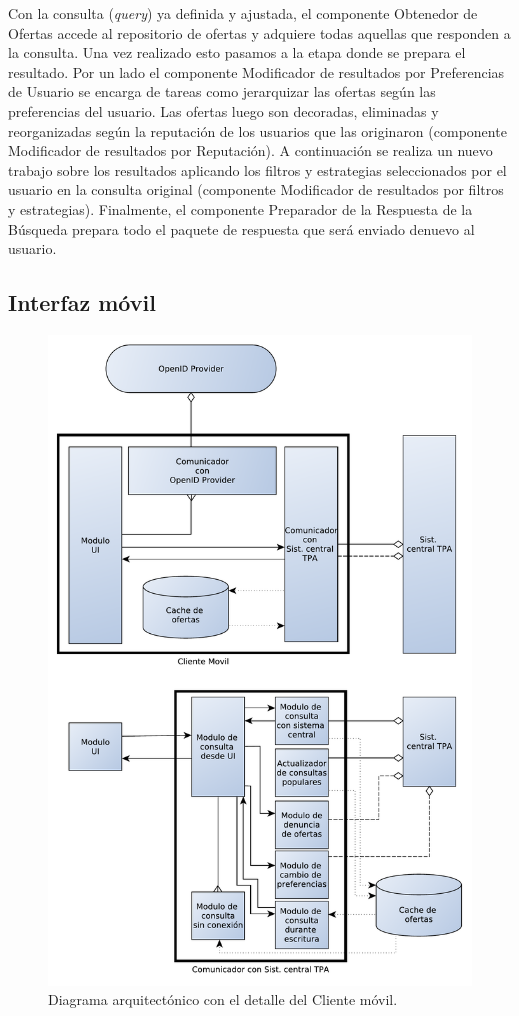 Con la consulta (\emph{query}) ya definida y ajustada, el componente \textsf{Obtenedor de Ofertas} accede al repositorio de ofertas y adquiere todas aquellas que responden a la consulta.  Una vez realizado esto pasamos a la etapa donde se prepara el resultado. Por un lado el componente \textsf{Modificador de resultados por Preferencias de Usuario} se encarga de tareas como jerarquizar las ofertas según las preferencias del usuario. Las ofertas luego son decoradas, eliminadas y reorganizadas según la reputación de los usuarios que las originaron (componente \textsf{Modificador de resultados por Reputación}). A continuación se realiza un nuevo trabajo sobre los resultados aplicando los filtros y estrategias seleccionados por el usuario en la consulta original (componente \textsf{Modificador de resultados por filtros y estrategias}). Finalmente, el componente \textsf{Preparador de la Respuesta de la Búsqueda} prepara todo el paquete de respuesta que será enviado denuevo al usuario. 

\subsection{Interfaz móvil}

\begin{figure}[H]
	\centering
	\includegraphics[width=\textwidth]{graficos/arch/Cliente_movil.pdf}
	\caption{Diagrama arquitectónico con el detalle del \textsf{Cliente móvil}.}
\end{figure}

